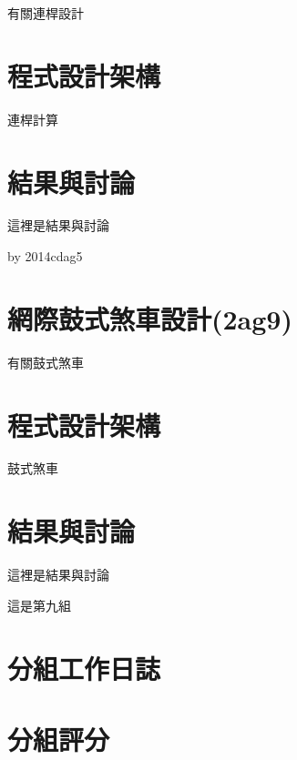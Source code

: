 \documentclass[]{article}
\begin{document}
有關連桿設計

\section{程式設計架構}\label{ux7a0bux5f0fux8a2dux8a08ux67b6ux69cb-4}

連桿計算

\section{結果與討論}\label{ux7d50ux679cux8207ux8a0eux8ad6-4}

這裡是結果與討論

by 2014cdag5

\section{網際鼓式煞車設計(2ag9)}\label{ux7db2ux969bux9f13ux5f0fux715eux8ecaux8a2dux8a082ag9}

有關鼓式煞車

\section{程式設計架構}\label{ux7a0bux5f0fux8a2dux8a08ux67b6ux69cb-5}

鼓式煞車

\section{結果與討論}\label{ux7d50ux679cux8207ux8a0eux8ad6-5}

這裡是結果與討論

這是第九組

\section{分組工作日誌}\label{ux5206ux7d44ux5de5ux4f5cux65e5ux8a8c}

\section{分組評分}\label{ux5206ux7d44ux8a55ux5206}
\end{document}
